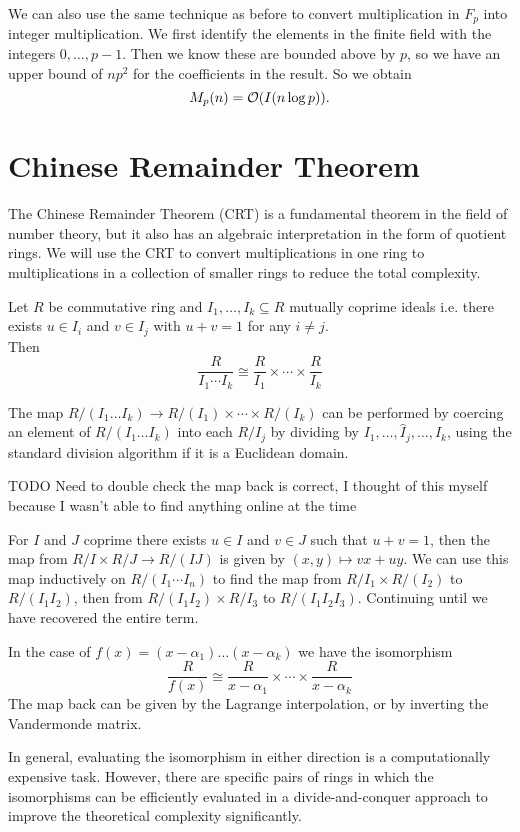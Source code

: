 We can also use the same technique as before to convert multiplication in $F_p$ into integer multiplication. We first identify the elements in the finite field with the integers $0,\ldots, p-1$. Then we know these are bounded above by $p$, so we have an upper bound of $np^2$ for the coefficients in the result. So we obtain
\[
    M_p(n) = \mathcal O(I(n \log p)).
\]

\section{Chinese Remainder Theorem}%
\label{sec:crt}

The Chinese Remainder Theorem (CRT) is a fundamental theorem in the field of number theory, but it also has an algebraic interpretation in the form of quotient rings. We will use the CRT to convert multiplications in one ring to multiplications in a collection of smaller rings to reduce the total complexity.

\begin{theorem}
    Let $R$ be commutative ring and $I_1, \ldots, I_k \subseteq R$ mutually coprime ideals i.e. there exists $u \in I_i$ and $v \in I_j$ with $u + v = 1$ for any $i \neq j$.\\
    Then
    \[
        \frac{R}{I_1\cdots I_k} \cong \frac{R}{I_1} \times \cdots \times \frac{R}{I_k}
    \]
\end{theorem}

\medskip

The map $R/(I_1\ldots I_k) \to R/(I_1) \times \cdots \times R/(I_k)$ can be performed by coercing an element of $R/(I_1 \ldots I_k)$ into each $R / I_j$ by dividing by $I_1, \ldots, \hat{I}_j, \ldots, I_k$, using the standard division algorithm if it is a Euclidean domain.

\medskip
TODO Need to double check the map back is correct, I thought of this myself because I wasn't able to find anything online at the time

For $I$ and $J$ coprime there exists $u \in I$ and $v \in J$ such that $u + v = 1$, then the map from $R/I \times R/J \to R/(IJ)$ is given by $(x, y) \mapsto vx + uy$. We can use this map inductively on $R/(I_1\cdots I_n)$ to find the map from $R / I_1 \times R / (I_2)$ to $R / (I_1I_2)$, then from $R / (I_1I_2) \times R / I_3$ to $R / (I_1I_2I_3)$. Continuing until we have recovered the entire term.

In the case of $f(x) = (x - \alpha_1) \ldots (x - \alpha_k)$ we have the isomorphism
\[
    \frac{R}{f(x)} \cong \frac{R}{x - \alpha_1} \times \cdots \times \frac{R}{x - \alpha_k}
\]
The map back can be given by the Lagrange interpolation, or by inverting the Vandermonde matrix.

In general, evaluating the isomorphism in either direction is a computationally expensive task. However, there are specific pairs of rings in which the isomorphisms can be efficiently evaluated in a divide-and-conquer approach to improve the theoretical complexity significantly.
